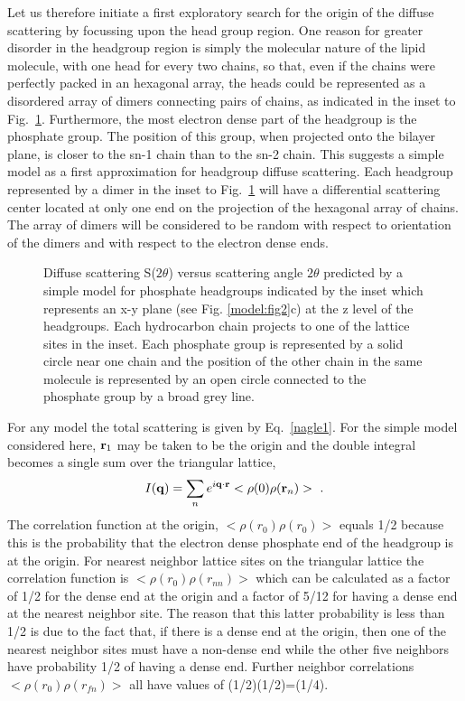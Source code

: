 Let us therefore initiate a first exploratory search for the origin
of the diffuse scattering by focussing upon the head group region.  One
reason for greater disorder in the headgroup region is simply the molecular
nature of the lipid molecule, with one head for every two chains, so
that, even if the chains were perfectly packed in an hexagonal array, the
heads could be represented as a disordered array of dimers connecting pairs
of chains, as indicated in the inset to Fig.\ \ref{model:fig7}.  Furthermore, the 
most electron dense
part of the headgroup is the phosphate group.  The position of this group,
when projected onto the bilayer plane, is closer to the sn-1 chain than to
the sn-2 chain.  This suggests a simple model as a first
approximation for headgroup diffuse scattering.  Each headgroup represented
by a dimer in the inset to Fig.\ \ref{model:fig7} will have a differential scattering 
center located at 
only one end on the projection of the hexagonal array of chains. 
The array of dimers will be considered to be random with respect to orientation
of the dimers and with respect to the electron dense ends.

\begin{figure}[ht]
\centerline {}
\caption{Diffuse scattering S($2 \theta$) versus scattering angle $2 \theta$
predicted by a simple model for phosphate headgroups indicated by the inset
which represents an x-y plane (see Fig. \ref{model:fig2}c) at the z level 
of the headgroups.
Each hydrocarbon chain projects to one of the lattice sites in the
inset.  Each phosphate group is represented by a solid circle near one
chain and
the position of the other chain in the same molecule is
represented by an open circle connected to the phosphate group by a
broad grey line.
\label{model:fig7}}
\end{figure}

For any model the total scattering is given by Eq.\ \ref{nagle1}.
For the simple model considered here, ${\bf r}_{1}$ may be taken to be the origin
and the double integral becomes a single sum over the triangular lattice,
\begin{equation}
\label{D3}
I({\bf q}) = \sum_{n} e^{i {\bf q} \cdot {\bf r}} <\rho(0) \rho({\bf r}_{n})>~.
\end{equation}
The correlation function at the origin,
$<\rho(r_{0}) \rho(r_{0})>$ equals 1/2 because this is the probability that the electron
dense phosphate end of the headgroup is at the origin.  For nearest neighbor
lattice sites on the triangular lattice the correlation function
is $<\rho(r_{0}) \rho(r_{nn})>$ which can be calculated as a factor of 1/2 for the dense
end at the origin and a factor of 5/12 for having a dense end at the nearest
neighbor site.  The reason that this latter probability is less than 1/2 is
due to the fact that, if there is a dense end at the origin, then one of the
nearest neighbor sites must have a non-dense end while the other five neighbors
have probability 1/2 of having a dense end.  Further neighbor correlations
$<\rho(r_{0}) \rho(r_{fn})>$ all have values of (1/2)(1/2)=(1/4).  

